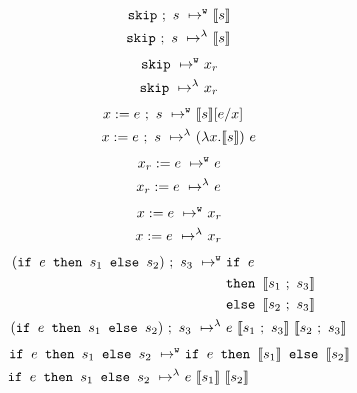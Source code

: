 \documentclass[11pt, leqno, titlepage]{article}
\theoremstyle{definition}
\begin{document}
\begin{align}
  \texttt{skip} ~;~s ~\mapsto^{\texttt{w}}~ & \llbracket s \rrbracket\\
  \texttt{skip} ~;~s ~\mapsto^\lambda~ & \llbracket s \rrbracket\notag
\end{align}
\begin{align}
  \texttt{skip}     ~\mapsto^{\texttt{w}}~ & x_r\\
  \texttt{skip}     ~\mapsto^\lambda~ & x_r\notag
\end{align}
\begin{align}
  x := e~;~s        ~\mapsto^{\texttt{w}}~ & \llbracket s\rrbracket[e / x]\notag\\
  x := e~;~s        ~\mapsto^\lambda~ & (\lambda x.\llbracket s \rrbracket)~e
\end{align}
\begin{align}
  x_r := e          ~\mapsto^{\texttt{w}}~ & e \\
  x_r := e          ~\mapsto^\lambda~ & e \notag
\end{align}
\begin{align}
  x := e            ~\mapsto^{\texttt{w}}~ & x_r \\
  x := e            ~\mapsto^\lambda~ & x_r \notag
\end{align}
\begin{align}
  (\texttt{if } e \texttt{ then } s_1 \texttt{ else } s_2) ~;~s_3
                    ~\mapsto^{\texttt{w}}~ & \texttt{if } e \\
                    &  \texttt{then } \llbracket s_1 ~;~ s_3 \rrbracket\notag\\
                    & \texttt{else } \llbracket s_2 ~;~ s_3 \rrbracket \notag\\
  (\texttt{if } e \texttt{ then } s_1 \texttt{ else } s_2) ~;~s_3
                    ~\mapsto^\lambda~ &  e ~\llbracket s_1 ~;~ s_3 \rrbracket 
                                             ~\llbracket s_2 ~;~ s_3 \rrbracket \notag
\end{align}
\begin{align}
  \texttt{if } e \texttt{ then } s_1 \texttt{ else } s_2
                    ~\mapsto^{\texttt{w}}~ & \texttt{if } e
                                  \texttt{ then } \llbracket s_1 \rrbracket
                                  \texttt{ else } \llbracket s_2 \rrbracket \\
  \texttt{if } e \texttt{ then } s_1 \texttt{ else } s_2
                    ~\mapsto^\lambda~ & e~ \llbracket s_1 \rrbracket
                                             ~ \llbracket s_2 \rrbracket \notag
\end{align}
\end{document}
